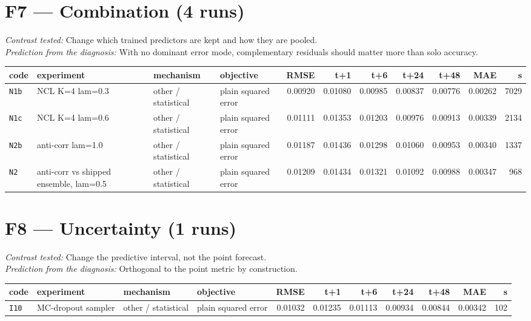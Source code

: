 \documentclass[9pt,landscape]{article}
\begin{document}
\section*{F7 --- Combination (4 runs)}
\noindent\emph{Contrast tested:} Change which trained predictors are kept and how they are pooled.\\
\emph{Prediction from the diagnosis:} With no dominant error mode, complementary residuals should matter more than solo accuracy.
\vspace{2pt}
\begin{longtable}{@{}p{1.1cm}p{5.4cm}p{3.1cm}p{2.7cm}rrrrrrr@{}}
\toprule code & experiment & mechanism & objective & RMSE & t+1 & t+6 & t+24 & t+48 & MAE & s \\ \midrule \endhead
\texttt{N1b} & NCL K=4 lam=0.3 & other / statistical & plain squared error & 0.00920 & 0.01080 & 0.00985 & 0.00837 & 0.00776 & 0.00262 & 7029 \\
\texttt{N1c} & NCL K=4 lam=0.6 & other / statistical & plain squared error & 0.01111 & 0.01353 & 0.01203 & 0.00976 & 0.00913 & 0.00339 & 2134 \\
\texttt{N2b} & anti-corr lam=1.0 & other / statistical & plain squared error & 0.01187 & 0.01436 & 0.01298 & 0.01060 & 0.00953 & 0.00340 & 1337 \\
\texttt{N2} & anti-corr vs shipped ensemble, lam=0.5 & other / statistical & plain squared error & 0.01209 & 0.01434 & 0.01321 & 0.01092 & 0.00988 & 0.00347 & 968 \\
\bottomrule\end{longtable}

\section*{F8 --- Uncertainty (1 runs)}
\noindent\emph{Contrast tested:} Change the predictive interval, not the point forecast.\\
\emph{Prediction from the diagnosis:} Orthogonal to the point metric by construction.
\vspace{2pt}
\begin{longtable}{@{}p{1.1cm}p{5.4cm}p{3.1cm}p{2.7cm}rrrrrrr@{}}
\toprule code & experiment & mechanism & objective & RMSE & t+1 & t+6 & t+24 & t+48 & MAE & s \\ \midrule \endhead
\texttt{I10} & MC-dropout sampler & other / statistical & plain squared error & 0.01032 & 0.01235 & 0.01113 & 0.00934 & 0.00844 & 0.00342 & 102 \\
\bottomrule\end{longtable}
\end{document}
